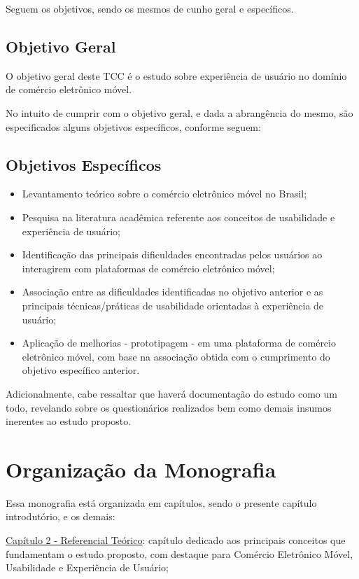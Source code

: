 Seguem os objetivos, sendo os mesmos de cunho geral e específicos.

\subsection{Objetivo Geral}
O objetivo geral deste TCC é o estudo sobre experiência de usuário no domínio de comércio eletrônico móvel.

No intuito de cumprir com o objetivo geral, e dada a abrangência do mesmo, são especificados alguns objetivos específicos, conforme seguem:

\subsection{Objetivos Específicos}
	\begin{itemize}
		\item Levantamento teórico sobre o comércio eletrônico móvel no Brasil;
        \item Pesquisa na literatura acadêmica referente aos conceitos de usabilidade e experiência de usuário;
        \item Identificação das principais dificuldades encontradas pelos usuários ao interagirem com plataformas de comércio eletrônico móvel;
        \item Associação entre as dificuldades identificadas no objetivo anterior e as principais técnicas/práticas de usabilidade orientadas à experiência de usuário;
        \item Aplicação de melhorias - prototipagem - em uma plataforma de comércio eletrônico móvel, com base na associação obtida com o cumprimento do objetivo específico anterior.
	\end{itemize} 

Adicionalmente, cabe ressaltar que haverá documentação do estudo como um todo, revelando sobre os questionários realizados bem como demais insumos inerentes ao estudo proposto.



\section{Organização da Monografia} 
    \label{mono}
    
Essa monografia está organizada em capítulos, sendo o presente capítulo introdutório, e os demais:

\hyperref[chap:ReferencialTeorico]{Capítulo 2 - Referencial Teórico}: capítulo dedicado aos principais conceitos que fundamentam o estudo proposto, com destaque para Comércio Eletrônico Móvel, Usabilidade e Experiência de Usuário;

